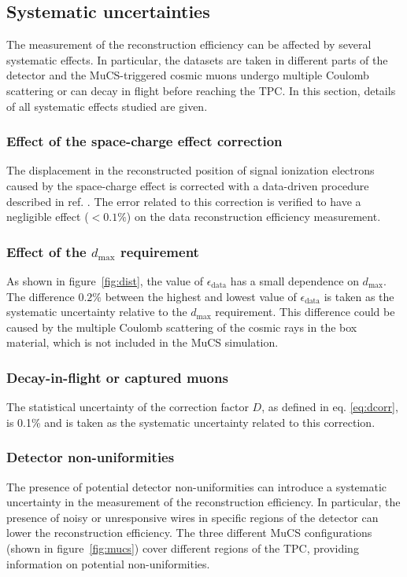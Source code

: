 \documentclass[a4paper,11pt]{article}
\begin{document}
\subsection{Systematic uncertainties}\label{sec:sys}
The measurement of the reconstruction efficiency can be affected by several systematic effects. In particular, the datasets are taken in different parts of the detector and the MuCS-triggered cosmic muons undergo multiple Coulomb scattering or can decay in flight before reaching the TPC. In this section, details of all systematic effects studied are given.

\subsubsection{Effect of the space-charge effect correction}
The displacement in the reconstructed position of signal ionization electrons caused by the space-charge effect is corrected with a data-driven procedure described in ref. \cite{sce}. The error related to this correction is verified to have a negligible effect ($<0.1\%$) on the data reconstruction efficiency measurement.

\subsubsection{Effect of the $d_{\mathrm{max}}$ requirement}

As shown in figure~\ref{fig:dist}, the value of $\epsilon_{\mathrm{data}}$ has a small dependence on $d_{\mathrm{max}}$. The difference $0.2\%$ between the highest and lowest value of $\epsilon_{\mathrm{data}}$ is taken as the systematic uncertainty relative to the $d_{\mathrm{max}}$ requirement. This difference could be caused by the multiple Coulomb scattering of the cosmic rays in the box material, which is not included in the MuCS simulation.

\subsubsection{Decay-in-flight or captured muons}\label{sec:dif}
The statistical uncertainty of the correction factor $D$, as defined in eq. \eqref{eq:dcorr}, is 0.1\% and is taken as the systematic uncertainty related to this correction.

\subsubsection{Detector non-uniformities}\label{sec:wires}
The presence of potential detector non-uniformities can introduce a systematic uncertainty in the measurement of the reconstruction efficiency. In particular, the presence of noisy or unresponsive wires in specific regions of the detector can lower the reconstruction efficiency. The three different MuCS configurations (shown in figure~\ref{fig:mucs}) cover different regions of the TPC, providing information on potential non-uniformities.
\end{document}
